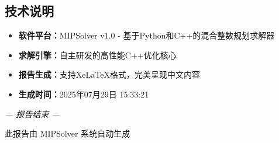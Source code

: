\documentclass[12pt,a4paper]{article}
\begin{document}
\subsection{技术说明}

\begin{itemize}
\item \textbf{软件平台：}MIPSolver v1.0 - 基于Python和C++的混合整数规划求解器
\item \textbf{求解引擎：}自主研发的高性能C++优化核心
\item \textbf{报告生成：}支持XeLaTeX格式，完美呈现中文内容
\item \textbf{生成时间：}2025年07月29日 15:33:21
\end{itemize}

\vspace{1cm}

\begin{center}
\textit{--- 报告结束 ---}

\small{此报告由 MIPSolver 系统自动生成}
\end{center}
\end{document}
